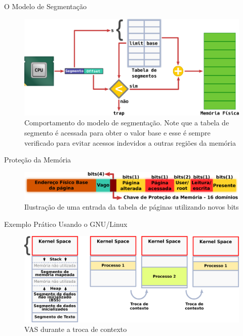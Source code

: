 \documentclass[xcolor={usenames,svgnames,dvipsnames},brazil,english,12pt,aspectratio=149]{beamer}
\begin{document}
\begin{frame}{O Modelo de Segmentação}
	\begin{figure}[!h]
		\centering
		\includegraphics[width=.80\textwidth]{segmentacao} 
		\caption{Comportamento do modelo de segmentação. Note que a tabela de segmento é acessada para obter o valor base e esse é sempre verificado para evitar acessos indevidos a outras regiões da memória}
		\label{fig:segmentacao} 
	\end{figure}
\end{frame}

\begin{frame}{Proteção da Memória}
	\begin{figure}[!h]
		\centering
		\includegraphics[width=.80\textwidth]{pte_domain} 
		\caption{Ilustração de uma entrada da tabela de páginas utilizando novos bits}
		\label{fig:ptedominio} 
	\end{figure}
\end{frame}

\begin{frame}{Exemplo Prático Usando o GNU/Linux}
	\begin{figure}[!h]
		\centering
		\includegraphics[width=\textwidth]{segmento_troca_contexto}
		\caption{VAS durante a troca de contexto}
		\label{fig:vas_contexto}
	\end{figure}
\end{frame}
\end{document}
